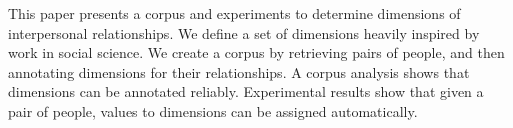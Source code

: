 This paper presents a corpus and experiments to determine dimensions of interpersonal relationships. We define a set of dimensions heavily inspired by work in social science. We create a corpus by retrieving pairs of people, and then annotating dimensions for their relationships. A corpus analysis shows that dimensions can be annotated reliably. Experimental results show that given a pair of people, values to dimensions can be assigned automatically.
